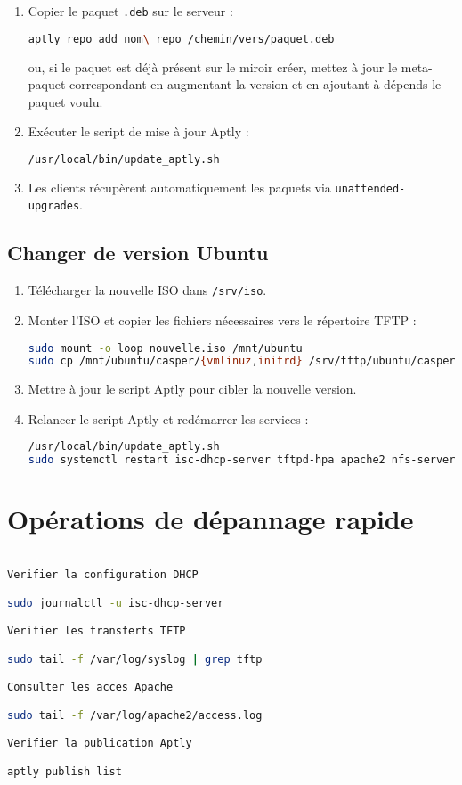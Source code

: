 \documentclass[a4paper,12pt]{article}
\begin{document}
\begin{enumerate}
\item Copier le paquet \texttt{.deb} sur le serveur :
\begin{lstlisting}[language=bash]
aptly repo add nom\_repo /chemin/vers/paquet.deb
\end{lstlisting}
ou, si le paquet est déjà présent sur le miroir créer, mettez à jour le meta-paquet correspondant en augmentant la version et en ajoutant à dépends le paquet voulu.
\item Exécuter le script de mise à jour Aptly :
\begin{lstlisting}[language=bash]
/usr/local/bin/update_aptly.sh
\end{lstlisting}
\item Les clients récupèrent automatiquement les paquets via \texttt{unattended-upgrades}.
\end{enumerate}

\subsection{Changer de version Ubuntu}
\begin{enumerate}
\item Télécharger la nouvelle ISO dans \texttt{/srv/iso}.
\item Monter l’ISO et copier les fichiers nécessaires vers le répertoire TFTP :
\begin{lstlisting}[language=bash]
sudo mount -o loop nouvelle.iso /mnt/ubuntu
sudo cp /mnt/ubuntu/casper/{vmlinuz,initrd} /srv/tftp/ubuntu/casper/
\end{lstlisting}
\item Mettre à jour le script Aptly pour cibler la nouvelle version.
\item Relancer le script Aptly et redémarrer les services :
\begin{lstlisting}[language=bash]
/usr/local/bin/update_aptly.sh
sudo systemctl restart isc-dhcp-server tftpd-hpa apache2 nfs-server
\end{lstlisting}
\end{enumerate}

\section{Opérations de dépannage rapide}
\begin{lstlisting}[language=bash]

Verifier la configuration DHCP

sudo journalctl -u isc-dhcp-server

Verifier les transferts TFTP

sudo tail -f /var/log/syslog | grep tftp

Consulter les acces Apache

sudo tail -f /var/log/apache2/access.log

Verifier la publication Aptly

aptly publish list
\end{lstlisting}
\end{document}
